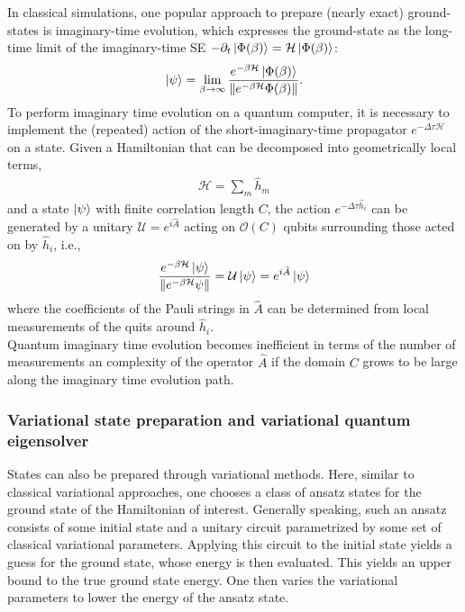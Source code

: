 \documentclass{book}
\theoremstyle{definition}
\newcommand{\p}{\partial}
\newcommand{\had}{\mathcal{H}}
\newcommand{\f}[2]{\frac{#1}{#2}}
\newcommand{\U}{\mathcal{U}}
\begin{document}
\begin{enumerate}
	In classical simulations, one popular approach to prepare (nearly exact) ground-states is imaginary-time evolution,
	which expresses the ground-state as the long-time limit of the
	imaginary-time SE $-\p_t \ket{\Phi(\beta)} = \had \ket{\Phi(\beta)}$:
	\begin{align}
	\ket{\psi} = \lim_{\beta \to \infty} \f{e^{-\beta \had} \ket{\Phi(\beta)}}{\norm{e^{-\beta \had} \Phi(\beta)}}.
	\end{align} 
	To perform imaginary time evolution on a quantum computer, it is necessary to implement the (repeated) action of the
	short-imaginary-time propagator $e^{-\Delta \tau \had}$
	on a state. Given a Hamiltonian that can be decomposed into geometrically local terms,
	\begin{align}
	\had = \sum _m \hat{h}_m
	\end{align}
	and a state $\ket{\psi}$ with finite correlation length $C$, the action $e^{-\Delta \tau \hat{h}_i}$ can be generated by a unitary $\U = e^{i\hat{A}}$ acting on $\mathcal{O}(C)$ qubits surrounding those acted on by $\hat{h}_i$, i.e.,
	\begin{align}
	\f{e^{-\beta \had} \ket{\psi}}{\norm{e^{-\beta \had} \psi}} = \U \ket{\psi}= e^{i\hat{A}}\ket{\psi}
	\end{align}	
	where the coefficients of the Pauli strings in $\hat{A}$ can be determined from local measurements of the quits around $\hat{h}_i$.\\
	
	Quantum imaginary time evolution becomes inefficient in terms of the number of measurements an complexity of the operator $\hat{A}$ if the domain $C$ grows to be large along the imaginary time evolution path. 
	
	
	
	
	
	
	
	
	
	
	
\end{enumerate}








\subsubsection{Variational state preparation and variational quantum eigensolver}


States can also be prepared through variational methods. Here, similar to classical variational approaches, one chooses a class of ansatz states for the ground state of the Hamiltonian of interest. Generally speaking, such an ansatz consists of some initial state and a unitary circuit parametrized by some set of classical variational parameters. Applying this circuit to the initial state
yields a guess for the ground state, whose energy is then evaluated. This yields an upper bound to the true ground state
energy. One then varies the variational parameters to lower
the energy of the ansatz state.\\
\end{document}
